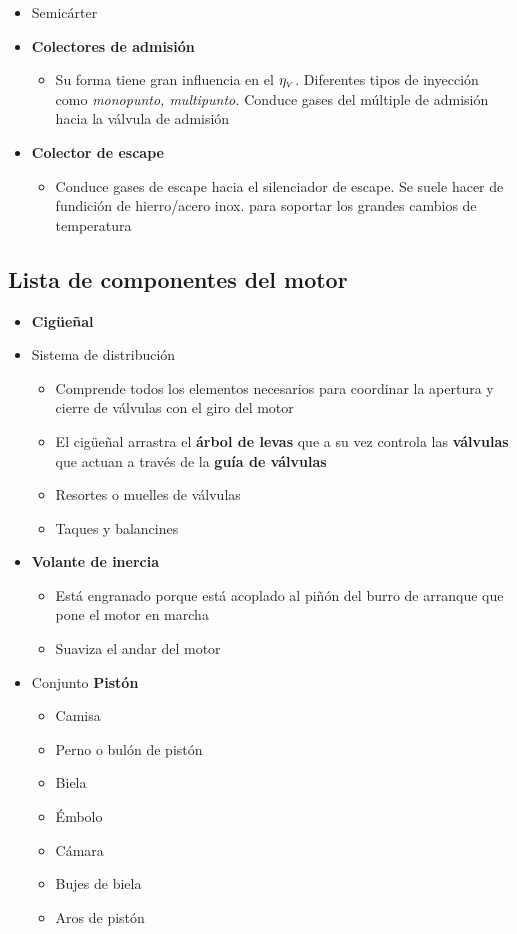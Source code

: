 \begin{itemize}
\begin{itemize}
\end{itemize}
\item Semicárter
\item \textbf{Colectores de admisión}
\begin{itemize}
\item Su forma tiene gran influencia en el $\eta_{{\mbox{\tiny$V$}}}$. Diferentes tipos de inyección como \textit{monopunto, multipunto.} Conduce gases del múltiple de admisión hacia la válvula de admisión
\end{itemize}
\item \textbf{Colector de escape}
\begin{itemize}
\item Conduce gases de escape hacia el silenciador de escape. Se suele hacer de fundición de hierro/acero inox. para soportar los grandes cambios de temperatura
\end{itemize}
\end{itemize}

\subsection{Lista de componentes del motor}
\begin{itemize}
\item \textbf{Cigüeñal}
\item Sistema de distribución
\begin{itemize}
\item Comprende todos los elementos necesarios para coordinar la apertura y cierre de válvulas con el giro del motor
\item El cigüeñal arrastra el \textbf{árbol de levas} que a su vez controla las \textbf{válvulas} que actuan a través de la \textbf{guía de válvulas}
\item Resortes o muelles de válvulas
\item Taques y balancines
\end{itemize}
\item \textbf{Volante de inercia}
\begin{itemize}
\item Está engranado porque está acoplado al piñón del burro de arranque que pone el motor en marcha
\item Suaviza el andar del motor
\end{itemize}
\item Conjunto \textbf{Pistón}
\begin{itemize}
\item Camisa
\item Perno o bulón de pistón
\item Biela
\item Émbolo
\item Cámara
\item Bujes de biela
\item Aros de pistón
\end{itemize}
\end{itemize}
